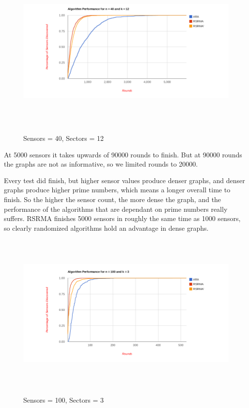 \begin{figure}[ht]
\caption{Sensors = 40, Sectors = 12}
\includegraphics[height = 8cm]{pics/graph40k12.png}\\[0.5cm] 
\label{fig:n40k12}   
\end{figure}

At 5000 sensors it takes upwards of 90000 rounds to finish. But at 90000 rounds the graphs are not as informative, so we limited rounds to 20000. 

Every test did finish, but higher sensor values produce denser graphs, and denser graphs produce higher prime numbers, which means a longer overall time to finish. So the higher the sensor count, the more dense the graph, and the performance of the algorithms that are dependant on prime numbers really suffers. RSRMA finishes 5000 sensors in roughly the same time as 1000 sensors, so clearly randomized algorithms hold an advantage in dense graphs.


\begin{figure}[ht]
\caption{Sensors = 100, Sectors = 3}
\includegraphics[height = 8cm]{pics/graph100k3.png}\\[0.5cm]    
\label{fig:n100k3}
\end{figure}

